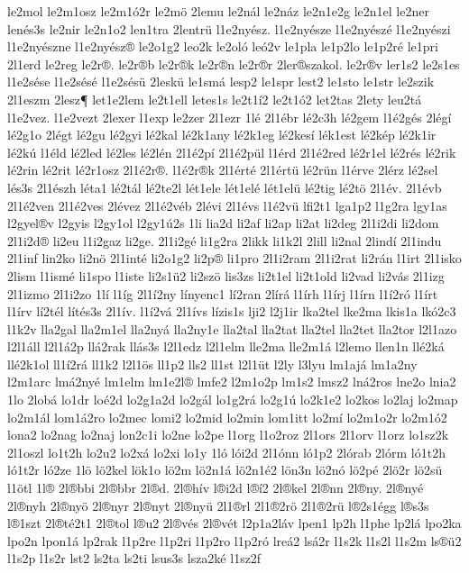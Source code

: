 {le2mol
le2m1osz
le2m1ó2r
le2mö
2lemu
le2nál
le2náz
le2n1e2g
le2n1el
le2ner
lenés3s
le2nir
le2n1o2
len1tra
2lentrü
l1e2nyész.
l1e2nyésze
l1e2nyészé
l1e2nyészi
l1e2nyészne
l1e2nyész®
le2o1g2
leo2k
le2oló
leó2v
le1pla
le1p2lo
le1p2ré
le1pri
2l1erd
le2reg
le2r®.
le2r®b
le2r®k
le2r®n
le2r®r
2ler®szakol.
le2r®v
ler1s2
le2s1es
l1e2sése
l1e2sésé
l1e2sésü
2leskü
le1smá
lesp2
le1spr
lest2
le1sto
le1str
le2szik
2l1eszm
2lesz¶
let1e2lem
le2t1ell
letes1s
le2t1í2
le2t1ó2
let2tas
2lety
leu2tá
l1e2vez.
l1e2vezt
2lexer
l1exp
le2zer
2l1ezr
1lé
2l1ébr
lé2c3h
lé2gem
l1é2gés
2légí
lé2g1o
2légt
lé2gu
lé2gyi
lé2kal
lé2k1any
lé2k1eg
lé2kesí
lék1est
lé2kép
lé2k1ir
lé2kú
l1éld
lé2led
lé2les
lé2lén
2l1é2pí
2l1é2pül
l1érd
2l1é2red
lé2r1el
lé2rés
lé2rik
lé2rin
lé2rit
lé2r1osz
2l1é2r®.
l1é2r®k
2l1érté
2l1értü
lé2rün
l1érve
2lérz
lé2sel
lés3s
2l1észh
léta1
lé2tál
lé2te2l
lét1ele
lét1elé
lét1elü
lé2tig
lé2tö
2l1év.
2l1évb
2l1é2ven
2l1é2ves
2lévez
2l1é2véb
2lévi
2l1évs
l1é2vü
lfi2t1
lga1p2
l1g2ra
lgy1as
l2gyel®v
l2gyis
l2gy1ol
l2gy1ú2s
1li
lia2d
li2af
li2ap
li2at
li2deg
2l1i2di
li2dom
2l1i2d®
li2eu
l1i2gaz
li2ge.
2l1i2gé
li1g2ra
2likk
li1k2l
2lill
li2nal
2lindí
2l1indu
2l1inf
lin2ko
li2nö
2l1inté
li2o1g2
li2p®
li1pro
2l1i2ram
2l1i2rat
li2rán
l1irt
2l1isko
2lism
l1ismé
li1spo
l1iste
li2s1ü2
li2szö
lis3zs
li2t1el
li2t1old
li2vad
li2vás
2l1izg
2l1izmo
2l1i2zo
1lí
l1íg
2l1í2ny
línyenc1
lí2ran
2lírá
l1írh
l1írj
l1írn
l1í2ró
l1írt
l1írv
lí2tél
lítés3s
2l1ív.
l1í2vá
2l1ívs
lízis1s
lji2
l2j1ir
lka2tel
lke2ma
lkis1a
lkó2c3
l1k2v
lla2gal
lla2m1el
lla2nyá
lla2ny1e
lla2tal
lla2tat
lla2tel
lla2tet
lla2tor
l2l1azo
l2l1áll
l2l1á2p
llá2rak
llás3s
l2l1edz
l2l1elm
lle2ma
lle2m1á
l2lemo
llen1n
llé2ká
llé2k1ol
ll1í2rá
ll1k2
l2l1ös
ll1p2
lls2
ll1st
l2l1üt
l2ly
l3lyu
lm1ajá
lm1a2ny
l2m1arc
lmá2nyé
lm1elm
lm1e2l®
lmfe2
l2m1o2p
lm1s2
lmsz2
lná2ros
lne2o
lnia2
1lo
2lobá
lo1dr
loé2d
lo2g1a2d
lo2gál
lo1g2rá
lo2g1ú
lo2k1e2
lo2kos
lo2laj
lo2map
lo2m1ál
lom1á2ro
lo2mec
lomi2
lo2mid
lo2min
lom1itt
lo2mí
lo2m1o2r
lo2m1ó2
lona2
lo2nag
lo2naj
lon2c1i
lo2ne
lo2pe
l1org
l1o2roz
2l1ors
2l1orv
l1orz
lo1sz2k
2l1oszl
lo1t2h
lo2u2
lo2xá
lo2xi
lo1y
1ló
lói2d
2l1ónn
ló1p2
2lórab
2lórm
ló1t2h
ló1t2r
ló2ze
1lö
lö2kel
lök1o
lö2m
lö2n1á
lö2n1é2
lön3n
lö2nó
lö2pé
2lö2r
lö2sü
l1ötl
1l®
2l®bbi
2l®bbr
2l®d.
2l®hív
l®i2d
l®í2
2l®kel
2l®nn
2l®ny.
2l®nyé
2l®nyh
2l®nyö
2l®nyr
2l®nyt
2l®nyü
2l1®rl
2l1®2rö
2l1®2rü
l®2s1égg
l®s3s
l®1szt
2l®té2t1
2l®tol
l®u2
2l®vés
2l®vét
l2p1a2láv
lpen1
lp2h
l1phe
lp2lá
lpo2ka
lpo2n
lpon1á
lp2rak
l1p2re
l1p2ri
l1p2ro
l1p2ró
lreá2
lsá2r
l1s2k
l1s2l
l1s2m
ls®ü2
l1s2p
l1s2r
lst2
ls2ta
ls2ti
lsus3s
lsza2ké
l1sz2f
}

